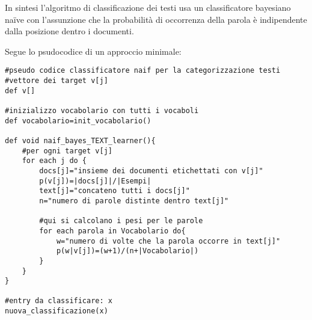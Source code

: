 \documentclass{article}
\theoremstyle{plain}
\theoremstyle{definition}
\begin{document}
In sintesi l'algoritmo di classificazione dei testi usa un classificatore bayesiano naïve con l'assunzione che la probabilità di occorrenza della parola è indipendente dalla posizione dentro i documenti.

Segue lo psudocodice di un approccio minimale:
\begin{lstlisting}
#pseudo codice classificatore naif per la categorizzazione testi
#vettore dei target v[j]
def v[]

#inizializzo vocabolario con tutti i vocaboli
def vocabolario=init_vocabolario()

def void naif_bayes_TEXT_learner(){
	#per ogni target v[j]
	for each j do {
		docs[j]="insieme dei documenti etichettati con v[j]"
		p(v[j])=|docs[j]|/|Esempi|
		text[j]="concateno tutti i docs[j]"
		n="numero di parole distinte dentro text[j]"
		
		#qui si calcolano i pesi per le parole
		for each parola in Vocabolario do{
			w="numero di volte che la parola occorre in text[j]"
			p(w|v[j])=(w+1)/(n+|Vocabolario|)
		}
	}
}

#entry da classificare: x
nuova_classificazione(x)
\end{lstlisting}
\end{document}
